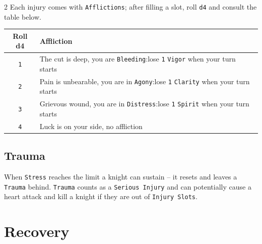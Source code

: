\documentclass{osr-template/zine}
\begin{document}
\begin{multicols*}{2}
Each injury comes with \texttt{Afflictions}; after filling a slot, roll \texttt{d4} and consult the table below.
\label{sec:affliction}
\begin{center}
    \begin{tabular}{|c|p{6.4cm}|}
        \hline
        \textbf{Roll d4} & \textbf{Affliction} \\
        \hline
        \texttt{1} & The cut is deep, you are \texttt{Bleeding}:\newline lose \texttt{1} \texttt{Vigor} when your turn starts\\
        \texttt{2} & Pain is unbearable, you are in \texttt{Agony}:\newline lose \texttt{1} \texttt{Clarity} when your turn starts\\
        \texttt{3} & Grievous wound, you are in \texttt{Distress}:\newline lose \texttt{1} \texttt{Spirit} when your turn starts\\
        \texttt{4} & Luck is on your side, no affliction \\
        \hline
    \end{tabular}
\end{center}

\subsection*{Trauma} When \texttt{Stress} reaches the limit a knight can sustain -- it resets and leaves a \texttt{Trauma} behind.
\texttt{Trauma} counts as a \texttt{Serious Injury} and can potentially cause a heart attack and kill a knight if they are out of \texttt{Injury Slots}.

\end{multicols*}

\newpage
\section*{\centering \fontsize{35}{45}\selectfont Recovery}
\vspace*{0.4 cm}
\end{document}
